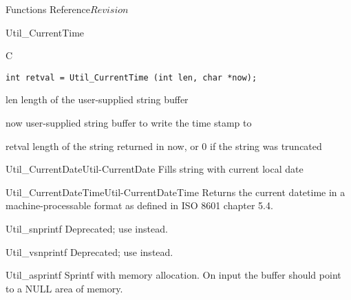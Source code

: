 \begin{cactuspart}{ Functions Reference}{}{$Revision$}
\begin{FunctionDescription}{Util\_CurrentTime}
\begin{SynopsisSection}
\begin{Synopsis}{C}
\begin{verbatim}
int retval = Util_CurrentTime (int len, char *now);
\end{verbatim}
\end{Synopsis}
\end{SynopsisSection}

\begin{ParameterSection}
\begin{Parameter}{len}
length of the user-supplied string buffer
\end{Parameter}
\begin{Parameter}{now}
user-supplied string buffer to write the time stamp to
\end{Parameter}
\end{ParameterSection}

\begin{ResultSection}
\begin{Result}{retval}
length of the string returned in {\code now}, or 0 if the string was truncated
\end{Result}
\end{ResultSection}

\begin{SeeAlsoSection}
\begin{SeeAlso2}{Util\_CurrentDate}{Util-CurrentDate}
  Fills string with current local date
\end{SeeAlso2}
\begin{SeeAlso2}{Util\_CurrentDateTime}{Util-CurrentDateTime}
  Returns the current datetime in a machine-processable format
as defined in ISO 8601 chapter 5.4.
\end{SeeAlso2}
\end{SeeAlsoSection}

\end{FunctionDescription}


\begin{FunctionDescription}{Util\_snprintf}
\label{Util-snprintf}
Deprecated; use  instead.
\end{FunctionDescription}

\begin{FunctionDescription}{Util\_vsnprintf}
\label{Util-vsnprintf}
Deprecated; use  instead.
\end{FunctionDescription}

\begin{FunctionDescription}{Util\_asprintf}
\label{Util-asprintf}
   Sprintf with memory allocation.  On input
   the buffer should point to a NULL area of memory.


\end{FunctionDescription}
\end{cactuspart}
